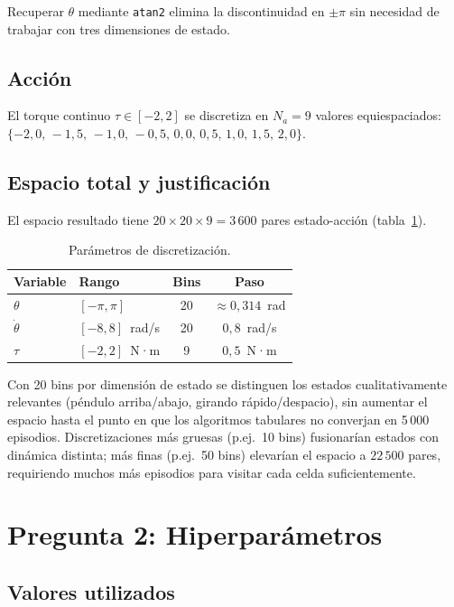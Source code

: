 \documentclass[12pt,a4paper]{article}
\begin{document}
Recuperar $\theta$ mediante \texttt{atan2} elimina la discontinuidad en $\pm\pi$
sin necesidad de trabajar con tres dimensiones de estado.

\subsection{Acción}

El torque continuo $\tau\in[-2{,}2]$ se discretiza en $N_a=9$ valores equiespaciados:
$\{-2{,}0,\,-1{,}5,\,-1{,}0,\,-0{,}5,\,0{,}0,\,0{,}5,\,1{,}0,\,1{,}5,\,2{,}0\}$.

\subsection{Espacio total y justificación}

El espacio resultado tiene $20\times 20\times 9=3\,600$ pares estado-acción
(tabla~\ref{tab:discretizacion}).

\begin{table}[H]
  \centering
  \caption{Parámetros de discretización.}
  \label{tab:discretizacion}
  \begin{tabular}{llcc}
    \toprule
    Variable & Rango & Bins & Paso \\
    \midrule
    $\theta$ & $[-\pi,\pi]$ & 20 & $\approx 0{,}314$~rad \\
    $\dot\theta$ & $[-8,8]$~rad/s & 20 & $0{,}8$~rad/s \\
    $\tau$ & $[-2,2]$~N·m & 9 & $0{,}5$~N·m \\
    \bottomrule
  \end{tabular}
\end{table}

Con 20 bins por dimensión de estado se distinguen los estados cualitativamente
relevantes (péndulo arriba/abajo, girando rápido/despacio), sin aumentar el espacio
hasta el punto en que los algoritmos tabulares no converjan en 5\,000 episodios.
Discretizaciones más gruesas (p.ej.\ 10 bins) fusionarían estados con dinámica
distinta; más finas (p.ej.\ 50 bins) elevarían el espacio a $22\,500$ pares,
requiriendo muchos más episodios para visitar cada celda suficientemente.

\section{Pregunta 2: Hiperparámetros}

\subsection{Valores utilizados}
\end{document}
